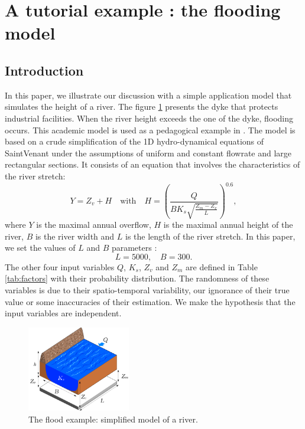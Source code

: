 \documentclass{uncecomp2019}
\begin{document}

\section{A tutorial example : the flooding model}

\subsection{Introduction}

In this paper, we illustrate our discussion with a simple application model that simulates 
the height of a river. 
The figure \ref{fig:crues} presents the dyke that protects industrial facilities. 
When the river height exceeds the one of the dyke, flooding occurs. 
This academic model is used as a pedagogical example in \cite{ioolem15}.
The model is based on a crude simplification of the 1D hydro-dynamical equations of SaintVenant 
under the assumptions of uniform and constant flowrate and large rectangular sections. 
It consists of an equation that involves the characteristics of the river stretch:
\begin{equation}\label{eq:cruesS}
Y = Z_v + H \quad \mbox{with} \quad 
H = \left(\frac{Q}{B K_s \sqrt{\frac{Z_m-Z_v}{L} }} \right)^{0.6},
\end{equation}
where $Y$ is the maximal annual overflow, $H$ is the maximal annual height of the river, 
$B$ is the river width and $L$ is the length of the river stretch. 
In this paper, we set the values of $L$ and $B$ parameters :
$$
L = 5000, \quad B = 300.
$$
The other four input variables $Q$, $K_s$, $Z_v$ and $Z_m$ are defined in Table \ref{tab:factors} 
with their  probability distribution.
The randomness of these variables is due to their spatio-temporal variability, our ignorance of 
their true value or some inaccuracies of their estimation. 
We make the hypothesis that the input variables are independent.

\begin{figure}
\begin{center}
    \includegraphics[width=0.4\textwidth]{figures/river_section_large_adjusted} 
\end{center}
\caption{The flood example: simplified model of a river.}\label{fig:crues}
\end{figure}
\end{document}
